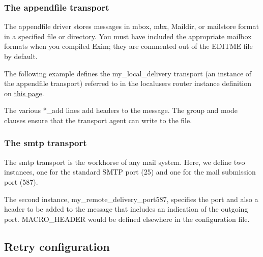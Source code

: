 \subsubsection[The {appendfile}
transport]{\texorpdfstring{\protect\hypertarget{part0026_split_051.htmlux5cux23_idTextAnchor1156}{}{}The
\protect\hypertarget{part0026_split_051.htmlux5cux23_idIndexMarker2664}{}{}{appendfile}
transport}{The appendfile transport}}

The {appendfile} driver stores messages in {mbox}, {mbx}, {Maildir}, or
{mailstore} format in a specified file or directory. You must have
included the appropriate mailbox formats when you compiled Exim; they
are commented out of the {EDITME} file by default.

The following example defines the {my\_local\_delivery} transport (an
instance of the {appendfile} transport{) }referred to in the
{localusers} router instance definition on
\protect\hyperlink{part0026_split_050.htmlux5cux23_idTextAnchor1149}{this
page}.\protect\hypertarget{part0026_split_051.htmlux5cux23_idIndexMarker2665}{}{}


The various *{\_add} lines add headers to the message. The {group} and
{mode} clauses ensure that the transport agent can write to the file.

\subsubsection[The {smtp}
transport]{\texorpdfstring{\protect\hypertarget{part0026_split_051.htmlux5cux23_idTextAnchor1157}{}{}The
\protect\hypertarget{part0026_split_051.htmlux5cux23_idIndexMarker2666}{}{}{smtp}
transport}{The smtp transport}}

The {smtp} transport is the workhorse of any mail system. Here, we
define two instances, one for the standard SMTP port (25) and one for
the mail submission port
(587).\protect\hypertarget{part0026_split_051.htmlux5cux23_idIndexMarker2667}{}{}


The second instance, {my\_remote\_delivery\_port587}, specifies the port
and also a header to be added to the message that includes an indication
of the outgoing port. {MACRO\_HEADER} would be defined elsewhere in the
configuration file.

\protect\hypertarget{part0026_split_052.html}{}{}

\hypertarget{part0026_split_052.htmlux5cux23_idContainer1247}{}
\hypertarget{part0026_split_052.htmlux5cux23calibre_pb_51}{%
\subsection[Retry
configuration]{\texorpdfstring{\protect\hypertarget{part0026_split_052.htmlux5cux23_idTextAnchor1158}{}{}Retry
configuration}{Retry configuration}}\label{part0026_split_052.htmlux5cux23calibre_pb_51}}

